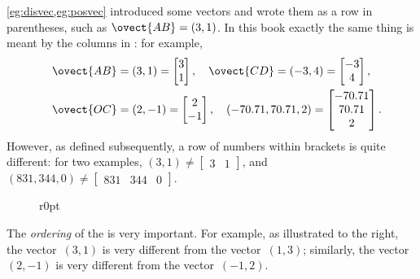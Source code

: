 \cref{eg:disvec,eg:posvec} introduced some vectors and wrote them as a row in parentheses, such as \(\ovect{AB}=(3,1)\).
In this book exactly the same thing is meant by the columns in : for example,
\begin{eqnarray*}&&
\ovect{AB}=(3,1)=\begin{bmatrix} 3\\1 \end{bmatrix},\quad
\ovect{CD}=(-3,4)=\begin{bmatrix} -3\\4 \end{bmatrix},\quad
\\&&
\ovect{OC}=(2,-1)=\begin{bmatrix} 2\\-1 \end{bmatrix},\quad
(-70.71,70.71,2)=\begin{bmatrix} -70.71\\70.71\\2 \end{bmatrix}.
\end{eqnarray*}
However, as defined subsequently, a row of numbers within brackets is  quite different: for two examples, \((3,1)\neq\begin{bmatrix} 3&1 \end{bmatrix}\),  and \((831,344,0)\neq\begin{bmatrix} 831&344&0 \end{bmatrix}\).


\begin{figure}r{0pt}
\end{figure}
The \emph{ordering} of the  is very important.
For example, as illustrated to the right, the vector~\((3,1)\) is very different from the vector~\((1,3)\); similarly, the vector~\((2,-1)\) is very different from the vector~\((-1,2)\).
 


